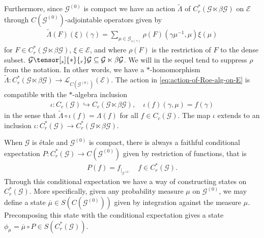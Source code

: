 \documentclass[11pt,a4paper,oneside,final,reqno]{amsart}
\theoremstyle{definition}
\newcommand{\G}{\mathcal{G}}
\newcommand{\Go}{\mathcal{G}^{(0)}}
\newcommand{\E}{\mathcal{E}}
\newcommand{\curlyL}{\mathcal{L}}
\newcommand{\Cred}{C_{r}^{*}}
\numberwithin{equation}{section}
\begin{document}
	Furthermore, since $\Go$ is compact we have an action $\tilde{\Lambda}$ of 
	$\Cred(\G \ltimes \beta\G)$ 
	on $\E$ through $C(\Go)$-adjointable operators given by
	\begin{align}\label{eq:action-of-Roe-alg-on-E}
		\tilde{\Lambda}(F)(\xi) (\gamma) = \sum_{\mu \in \G_{s(\gamma)}} \rho(F)( \gamma \mu^{-1}, \mu) \xi(\mu)
	\end{align}
	for $F \in \Cred(\G \ltimes \beta \G)$, 
	$\xi \in \E$, and where $\rho(F)$ is the restriction of $F$ to the dense subset. 
	$\G \tensor[_s]{*}{_r} \G \subseteq  \G \ltimes \beta\G$. We will in the sequel tend to suppress $\rho$ from the notation. 
	In other words, we have a $*$-homomorphism $\tilde{\Lambda} \colon \Cred (\G \ltimes \beta \G ) \to \curlyL_{C(\Go)} (\E)$. The action in \eqref{eq:action-of-Roe-alg-on-E} is compatible with the $*$-algebra inclusion \cite[Lemma 7.5]{DelarocheExactGroupoidsV3}
	\begin{align}\label{eq:inclusion-into-Roe}
		\iota \colon C_c (\G) \hookrightarrow C_c ( \G \ltimes \beta\G), \quad \iota(f)(\gamma, \mu) = f(\gamma)
	\end{align}
	in the sense that $\tilde{\Lambda}\circ \iota (f) = \Lambda (f)$ for all $f \in C_c(\G)$. The map $\iota$ extends to an inclusion $\iota \colon \Cred(\G) \to \Cred(\G \ltimes \beta \G)$. 
	
	
	
	When $\G$ is \'etale and $\Go$ is compact, there is always a faithful conditional expectation $P \colon \Cred (\G) \to C (\Go)$ given by restriction of functions, that is
	\begin{align}\label{eq:existence-cond-exp}
		P(f) = f_{\vert_{\Go}} \quad f \in \Cred (\G).
	\end{align}
	Through this conditional expectation we have a way of constructing states on $\Cred(\G)$. More specifically, given any probability measure $\mu$ on $\Go$, we may define a state $\overline{\mu} \in S(C(\Go))$ given by integration against the measure $\mu$. Precomposing this state with the conditional expectation gives a state $\phi_\mu = \overline{\mu} \circ P \in S(\Cred(\G))$. 
	
\end{document}
